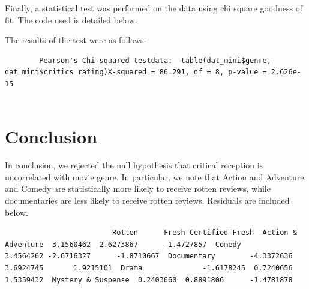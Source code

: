 \documentclass[12pt,a4paper]{article}
\begin{document}
Finally, a statistical test was performed on the data using chi square goodness of fit. The code used is detailed below.



The results of the test were as follows:

\begin{verbatim}
		Pearson's Chi-squared testdata:  table(dat_mini$genre, dat_mini$critics_rating)X-squared = 86.291, df = 8, p-value = 2.626e-15
		
\end{verbatim}

\section*{Conclusion}

In conclusion, we rejected the null hypothesis that critical reception is uncorrelated with movie genre. In particular, we note that Action and Adventure and Comedy are statistically more likely to receive rotten reviews, while documentaries are less likely to receive rotten reviews. Residuals are included below.

\begin{verbatim}
                         Rotten      Fresh Certified Fresh  Action & Adventure  3.1560462 -2.6273867      -1.4727857  Comedy              3.4564262 -2.6716327      -1.8710667  Documentary        -4.3372636  3.6924745       1.9215101  Drama              -1.6178245  0.7240656       1.5359432  Mystery & Suspense  0.2403660  0.8891806      -1.4781878
\end{verbatim}
\end{document}
